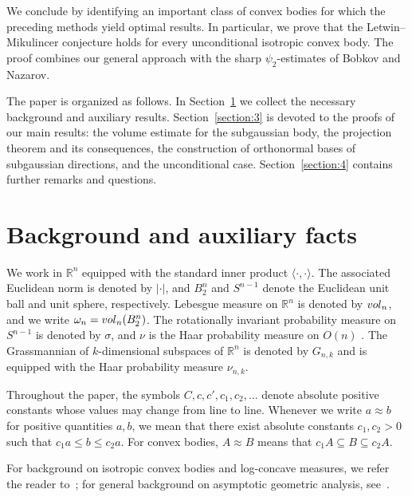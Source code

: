 \documentclass[10pt,a4paper]{amsart}
\numberwithin{equation}{section}
\newcommand{\ls}{\leqslant}
\begin{document}
We conclude by identifying an important class of convex bodies for which the preceding methods yield optimal results. In particular, we prove that the Letwin–Mikulincer conjecture holds for every unconditional isotropic convex body. The proof combines our general approach with the sharp $\psi_2$-estimates of Bobkov and Nazarov.

\smallskip

The paper is organized as follows. In Section~\ref{section:2} we collect the necessary background and auxiliary results. 
Section~\ref{section:3} is devoted to the proofs of our main results: the volume estimate for the subgaussian body, 
the projection theorem and its consequences, the construction of orthonormal bases of subgaussian directions, and the unconditional case.
Section~\ref{section:4} contains further remarks and questions.

\section{Background and auxiliary facts}\label{section:2}

We work in $\mathbb{R}^n$ equipped with the standard inner product $\langle \cdot, \cdot \rangle$.  
The associated Euclidean norm is denoted by $|\cdot|$, and $B_2^n$ and $S^{n-1}$ denote the Euclidean unit ball and unit sphere, respectively.  
Lebesgue measure on $\mathbb{R}^n$ is denoted by ${\rm vol}_n$, and we write $\omega_n = {\rm vol}_n(B_2^n)$.
The rotationally invariant probability measure on $S^{n-1}$ is denoted by $\sigma$, and $\nu$ is the Haar probability measure on $O(n)$ . 
The Grassmannian of $k$-dimensional subspaces of ${\mathbb{R}}^n$ is denoted by $G_{n,k}$ and is equipped with the Haar probability measure $\nu_{n,k}$. 

Throughout the paper, the symbols $C, c, c', c_1, c_2, \ldots$ denote absolute positive constants whose values may change from line to line.  
Whenever we write $a \approx b$ for positive quantities $a,b$, we mean that there exist absolute constants $c_1, c_2 > 0$ such that $c_1 a \ls b \ls c_2 a$. 
For convex bodies, $A\approx B$ means that $c_1A\subseteq B\subseteq c_2A$.

For background on isotropic convex bodies and log-concave measures, we refer the reader to~\cite{BGVV-book};  
for general background on asymptotic geometric analysis, see~\cite{AGA-book, AGA-book-2}.
\end{document}
